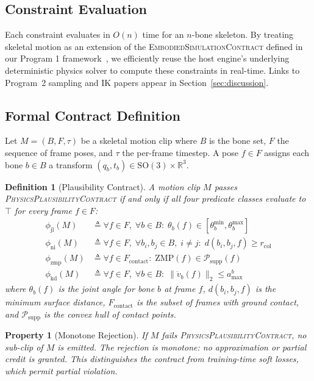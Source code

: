 \documentclass[sigconf,nonacm]{acmart}
\newcommand{\plausibility}{\textsc{PhysicsPlausibilityContract}}
\newcommand{\simcontract}{\textsc{EmbodiedSimulationContract}}
\newtheorem{definition}{Definition}
\newtheorem{property}{Property}
\begin{document}
\subsection{Constraint Evaluation}
Each constraint evaluates in $O(n)$ time for an $n$-bone skeleton. By treating skeletal motion as an extension of the \simcontract{} defined in our Program 1 framework~\cite{trustbyconstruction2026}, we efficiently reuse the host engine's underlying deterministic physics solver to compute these constraints in real-time. Links to Program~2 sampling and IK papers appear in Section~\ref{sec:discussion}.

\subsection{Formal Contract Definition}
\label{sec:contract:formal}

Let $M = (B, F, \tau)$ be a skeletal motion clip where $B$ is the bone set,
$F$ the sequence of frame poses, and $\tau$ the per-frame timestep. A pose
$f \in F$ assigns each bone $b \in B$ a transform $(q_b, t_b) \in
\mathrm{SO}(3) \times \mathbb{R}^3$.

\begin{definition}[Plausibility Contract]
A motion clip $M$ \emph{passes} \plausibility{} if and only if all four
predicate classes evaluate to $\top$ for every frame $f \in F$:
\begin{align}
  \phi_{\mathrm{jl}}(M) &\triangleq
    \forall f \in F,\; \forall b \in B:\;
    \theta_b(f) \in [\theta_b^{\min}, \theta_b^{\max}] \label{eq:jl}\\
  \phi_{\mathrm{ni}}(M) &\triangleq
    \forall f \in F,\; \forall b_i, b_j \in B,\; i \neq j:\;
    d(b_i, b_j, f) \geq r_{\mathrm{col}} \label{eq:ni}\\
  \phi_{\mathrm{zmp}}(M) &\triangleq
    \forall f \in F_{\mathrm{contact}}:\;
    \mathrm{ZMP}(f) \in \mathcal{P}_{\mathrm{supp}}(f) \label{eq:zmp}\\
  \phi_{\mathrm{kd}}(M) &\triangleq
    \forall f \in F,\; \forall b \in B:\;
    \|\dot{v}_b(f)\|_2 \leq a_{\max}^b \label{eq:kd}
\end{align}
where $\theta_b(f)$ is the joint angle for bone $b$ at frame $f$,
$d(b_i, b_j, f)$ is the minimum surface distance, $F_{\mathrm{contact}}$
is the subset of frames with ground contact, and $\mathcal{P}_{\mathrm{supp}}$
is the convex hull of contact points.
\end{definition}

\begin{property}[Monotone Rejection]
If $M$ fails \plausibility{}, no sub-clip of $M$ is emitted.
The rejection is \emph{monotone}: no approximation or partial credit is
granted. This distinguishes the contract from training-time soft losses,
which permit partial violation.
\end{property}
\end{document}
